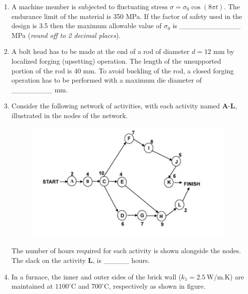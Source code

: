 \documentclass[12pt,onecolumn]{article}
\begin{document}
\begin{enumerate}
    \item A machine member is subjected to fluctuating stress $\sigma = \sigma_0 \cos(8\pi t)$. The endurance limit of the material is 350 MPa. If the factor of safety used in the design is 3.5 then the maximum allowable value of $\sigma_0$ is \_\_\_\_\_\_\_\_\_\_\_\_ MPa (\textit{round off to 2 decimal places}).

    \item A bolt head has to be made at the end of a rod of diameter $d = 12$ mm by localized forging (upsetting) operation. The length of the unsupported portion of the rod is 40 mm. To avoid buckling of the rod, a closed forging operation has to be performed with a maximum die diameter of \_\_\_\_\_\_\_\_ mm.

    \item Consider the following network of activities, with each activity named $\mathbf{A}$-$\mathbf{L}$, illustrated in the nodes of the network.

          \begin{figure}[H]
              \centering
              \includegraphics[scale=0.5]{q23s2}
              \label{fig:q23s2}
          \end{figure}

          The number of hours required for each activity is shown alongside the nodes. The slack on the activity $\mathbf{L}$, is \_\_\_\_\_ hours.

    \item In a furnace, the inner and outer sides of the brick wall ($k_1 = 2.5~\text{W/m.K}$) are maintained at $1100^\circ$C and $700^\circ$C, respectively as shown in figure.


\end{enumerate}
\end{document}
